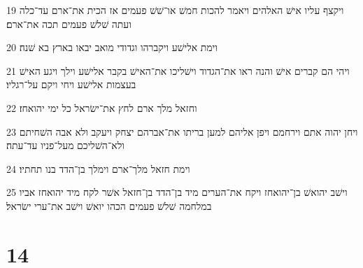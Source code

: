 \par 19 ויקצף עליו אישׁ האלהים ויאמר להכות חמשׁ או־שׁשׁ פעמים אז הכית את־ארם עד־כלה ועתה שׁלשׁ פעמים תכה את־ארם׃
\par 20 וימת אלישׁע ויקברהו וגדודי מואב יבאו בארץ בא שׁנה׃
\par 21 ויהי הם קברים אישׁ והנה ראו את־הגדוד וישׁליכו את־האישׁ בקבר אלישׁע וילך ויגע האישׁ בעצמות אלישׁע ויחי ויקם על־רגליו׃
\par 22 וחזאל מלך ארם לחץ את־ישׂראל כל ימי יהואחז׃
\par 23 ויחן יהוה אתם וירחמם ויפן אליהם למען בריתו את־אברהם יצחק ויעקב ולא אבה השׁחיתם ולא־השׁליכם מעל־פניו עד־עתה׃
\par 24 וימת חזאל מלך־ארם וימלך בן־הדד בנו תחתיו׃
\par 25 וישׁב יהואשׁ בן־יהואחז ויקח את־הערים מיד בן־הדד בן־חזאל אשׁר לקח מיד יהואחז אביו במלחמה שׁלשׁ פעמים הכהו יואשׁ וישׁב את־ערי ישׂראל׃

\chapter{14}

